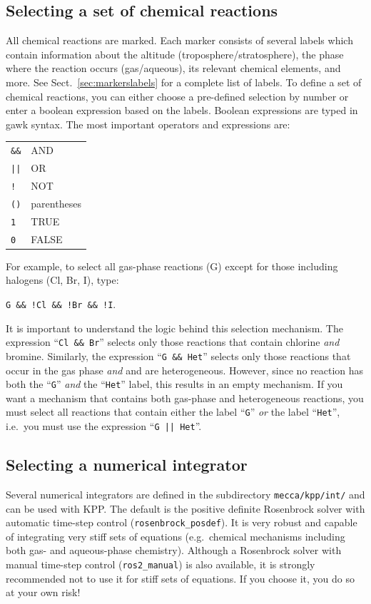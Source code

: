 \documentclass[twoside]{article}
\begin{document}
\subsection{Selecting a set of chemical reactions}
\label{sec:selectreactions}

All chemical reactions are marked. Each marker consists of several
labels which contain information about the altitude
(troposphere/stratosphere), the phase where the reaction occurs
(gas/aqueous), its relevant chemical elements, and more. See
Sect.~\ref{sec:markerslabels} for a complete list of labels. To define a
set of chemical reactions, you can either choose a pre-defined selection
by number or enter a boolean expression based on the labels. Boolean
expressions are typed in gawk syntax. The most important operators and
expressions are:\\
\begin{tabular}{l@{ = }l}
\verb|&&| & AND\\
\verb!||! & OR\\
\verb|!|  & NOT\\
\verb|()| & parentheses\\
\verb|1|  & TRUE\\
\verb|0|  & FALSE
\end{tabular}

For example, to select all gas-phase reactions (G) except for those
including halogens (Cl, Br, I), type:

\verb|G && !Cl && !Br && !I|.

It is important to understand the logic behind this selection mechanism.
The expression ``\verb|Cl && Br|'' selects only those reactions that
contain chlorine {\em and} bromine. Similarly, the expression
``\verb|G && Het|'' selects only those reactions that occur in the gas
phase {\em and} and are heterogeneous. However, since no reaction has
both the ``\verb|G|'' {\em and} the ``\verb|Het|'' label, this results
in an empty mechanism. If you want a mechanism that contains both
gas-phase and heterogeneous reactions, you must select all reactions
that contain either the label ``\verb|G|'' {\em or} the label
``\verb|Het|'', i.e.\ you must use the expression ``\verb!G || Het!''.

\subsection{Selecting a numerical integrator}
\label{sec:selectintegrator}

Several numerical integrators are defined in the subdirectory
\verb|mecca/kpp/int/| and can be used with KPP. The default is the
positive definite Rosenbrock solver with automatic time-step control
(\verb|rosenbrock_posdef|). It is very robust and capable of integrating
very stiff sets of equations (e.g.\ chemical mechanisms including both
gas- and aqueous-phase chemistry). Although a Rosenbrock solver with
manual time-step control (\verb|ros2_manual|) is also available, it is
strongly recommended not to use it for stiff sets of equations. If you
choose it, you do so at your own risk!
\end{document}
